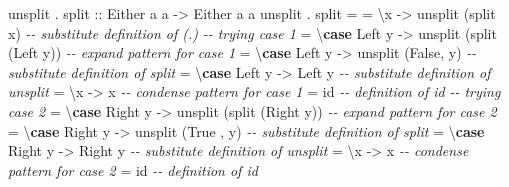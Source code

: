 \documentclass[]{article}
\newenvironment{Shaded}{}{}
\newcommand{\CommentTok}[1]{\textcolor[rgb]{0.38,0.63,0.69}{\textit{#1}}}
\newcommand{\DataTypeTok}[1]{\textcolor[rgb]{0.56,0.13,0.00}{#1}}
\newcommand{\FunctionTok}[1]{\textcolor[rgb]{0.02,0.16,0.49}{#1}}
\newcommand{\KeywordTok}[1]{\textcolor[rgb]{0.00,0.44,0.13}{\textbf{#1}}}
\newcommand{\NormalTok}[1]{#1}
\newcommand{\OperatorTok}[1]{\textcolor[rgb]{0.40,0.40,0.40}{#1}}
\newcommand{\OtherTok}[1]{\textcolor[rgb]{0.00,0.44,0.13}{#1}}
\begin{document}
\begin{Shaded}
\begin{Highlighting}[]
\NormalTok{unsplit }\OperatorTok{.}\OtherTok{ split ::} \DataTypeTok{Either}\NormalTok{ a a }\OtherTok{{-}\textgreater{}} \DataTypeTok{Either}\NormalTok{ a a}
\NormalTok{unsplit }\OperatorTok{.}\NormalTok{ split }\OtherTok{=}
    \OtherTok{=}\NormalTok{ \textbackslash{}x            }\OtherTok{{-}\textgreater{}}\NormalTok{ unsplit (split x)          }\CommentTok{{-}{-} substitute definition of (.)}
      \CommentTok{{-}{-} trying case 1}
    \OtherTok{=}\NormalTok{ \textbackslash{}}\KeywordTok{case} \DataTypeTok{Left}\NormalTok{  y }\OtherTok{{-}\textgreater{}}\NormalTok{ unsplit (split (}\DataTypeTok{Left}\NormalTok{  y))  }\CommentTok{{-}{-} expand pattern for case 1}
    \OtherTok{=}\NormalTok{ \textbackslash{}}\KeywordTok{case} \DataTypeTok{Left}\NormalTok{  y }\OtherTok{{-}\textgreater{}}\NormalTok{ unsplit (}\DataTypeTok{False}\NormalTok{, y)         }\CommentTok{{-}{-} substitute definition of split}
    \OtherTok{=}\NormalTok{ \textbackslash{}}\KeywordTok{case} \DataTypeTok{Left}\NormalTok{  y }\OtherTok{{-}\textgreater{}} \DataTypeTok{Left}\NormalTok{  y                    }\CommentTok{{-}{-} substitute definition of unsplit}
    \OtherTok{=}\NormalTok{ \textbackslash{}x            }\OtherTok{{-}\textgreater{}}\NormalTok{ x                          }\CommentTok{{-}{-} condense pattern for case 1}
    \OtherTok{=} \FunctionTok{id}                                          \CommentTok{{-}{-} definition of id}
      \CommentTok{{-}{-} trying case 2}
    \OtherTok{=}\NormalTok{ \textbackslash{}}\KeywordTok{case} \DataTypeTok{Right}\NormalTok{ y }\OtherTok{{-}\textgreater{}}\NormalTok{ unsplit (split (}\DataTypeTok{Right}\NormalTok{ y))  }\CommentTok{{-}{-} expand pattern for case 2}
    \OtherTok{=}\NormalTok{ \textbackslash{}}\KeywordTok{case} \DataTypeTok{Right}\NormalTok{ y }\OtherTok{{-}\textgreater{}}\NormalTok{ unsplit (}\DataTypeTok{True}\NormalTok{ , y)         }\CommentTok{{-}{-} substitute definition of split}
    \OtherTok{=}\NormalTok{ \textbackslash{}}\KeywordTok{case} \DataTypeTok{Right}\NormalTok{ y }\OtherTok{{-}\textgreater{}} \DataTypeTok{Right}\NormalTok{ y                    }\CommentTok{{-}{-} substitute definition of unsplit}
    \OtherTok{=}\NormalTok{ \textbackslash{}x            }\OtherTok{{-}\textgreater{}}\NormalTok{ x                          }\CommentTok{{-}{-} condense pattern for case 2}
    \OtherTok{=} \FunctionTok{id}                                          \CommentTok{{-}{-} definition of id}
\end{Highlighting}
\end{Shaded}
\end{document}
